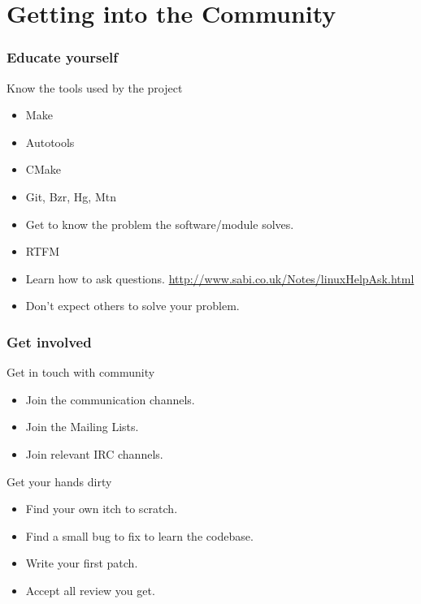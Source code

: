\documentclass[hyperref={pdfpagelabels=false},xcolor=pst,pdf,fragile]{beamer}
\begin{document}
\section{Getting into the Community}


\begin{frame}
  \frametitle{Educate yourself}

  \begin{block}{Know the tools used by the project}
	  \begin{itemize}
		\item Make
		\item Autotools
		\item CMake
		\item Git, Bzr, Hg, Mtn
	  \end{itemize}
  \end{block}

  \pause
  \begin{itemize}
	\item Get to know the problem the software/module solves.
	\item RTFM
	\item Learn how to ask questions.
		\url{http://www.sabi.co.uk/Notes/linuxHelpAsk.html}
	\item Don't expect others to solve your problem.
  \end{itemize}

\end{frame}

\begin{frame}
  \frametitle{Get involved}

  Get in touch with community
  \begin{itemize}
	\item Join the communication channels.
	\item Join the Mailing Lists.
	\item Join relevant IRC channels.
  \end{itemize}

  \vskip20pt
  \pause
  Get your hands dirty
  \begin{itemize}
	\item Find your own itch to scratch.
	\item Find a small bug to fix to learn the codebase.
	\item Write your first patch.
	\item Accept all review you get.
  \end{itemize}

\end{frame}
\end{document}
